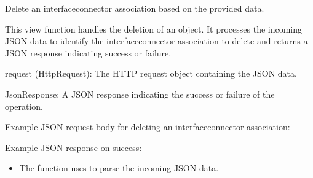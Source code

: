 \documentclass[letterpaper,10pt,english]{sphinxmanual}
\begin{document}

\begin{fulllineitems}
\label{\detokenize{app:app.views.delete_interface_connector}}
\pysigstartsignatures
{}
\pysigstopsignatures
\sphinxAtStartPar
Delete an interface\sphinxhyphen{}connector association based on the provided data.

\sphinxAtStartPar
This view function handles the deletion of an  object. 
It processes the incoming JSON data to identify the interface\sphinxhyphen{}connector 
association to delete and returns a JSON response indicating success or failure.
\begin{description}
\sphinxAtStartPar
request (HttpRequest): The HTTP request object containing the JSON data.

\sphinxAtStartPar
JsonResponse: A JSON response indicating the success or failure of the operation.

\sphinxAtStartPar
Example JSON request body for deleting an interface\sphinxhyphen{}connector association:

\begin{sphinxVerbatim}[commandchars=\\\{\}]
\end{sphinxVerbatim}

\sphinxAtStartPar
Example JSON response on success:

\begin{sphinxVerbatim}[commandchars=\\\{\}]
\end{sphinxVerbatim}

\begin{itemize}
\item {} 
\sphinxAtStartPar
The function uses  to parse the incoming JSON data.


\end{itemize}
\end{description}
\end{fulllineitems}
\end{document}

